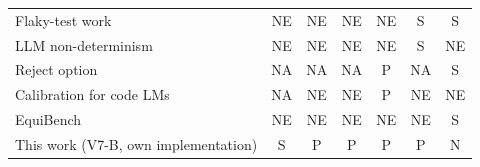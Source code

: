 \begin{table}[t]
\begin{tabular}{lcccccc}
Flaky-test work~\cite{lam2019idflakies,luo2014an,parry2021a} & NE & NE & NE & NE & S & S \\
LLM non-determinism~\cite{ouyang2025an} & NE & NE & NE & NE & S & NE \\
Reject option~\cite{geifman2017,hendrickx2024machine} & NA & NA & NA & P & NA & S \\
Calibration for code LMs~\cite{spiess2025calibration} & NA & NE & NE & P & NE & NE \\
EquiBench~\cite{wei2025equibench} & NE & NE & NE & NE & NE & S \\
\hline
This work (V7-B, own implementation) & S & P & P & P & P & N \\
\hline
\end{tabular}
\end{table}
